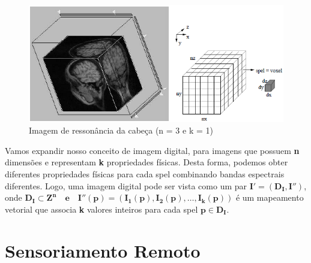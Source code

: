 \documentclass[12pt, a4paper]{article}
\begin{document}
    \begin{figure}[!htb]
    	\centering
    	\includegraphics{Screenshot_4}
    	\caption{Imagem de ressonância da cabeça (n = 3 e k = 1)}
    	\label{figRotulo}
  	\end{figure}
    \vspace{3mm}
    Vamos expandir nosso conceito de imagem digital, para imagens que possuem \textbf{n} dimensões e representam \textbf{k} propriedades físicas. Desta forma, podemos obter diferentes propriedades físicas para cada spel combinando bandas espectrais diferentes. 
    Logo, uma imagem digital pode ser vista como um par $\mathbf{I'= (D_I, I'')}
$, onde $\mathbf{D_I \subset Z^n\quad\mbox{e}\quad I''(p)=(I_1(p),I_2(p),\dots,I_k(p))}$ é um mapeamento vetorial que associa \textbf{k} valores
inteiros para cada spel $\mathbf{p \in D_I}$.
    
    \section{Sensoriamento Remoto}
\end{document}
